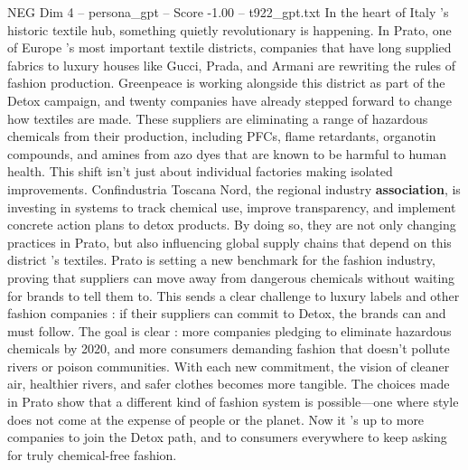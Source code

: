 \begin{textsample}{NEG Dim 4 – persona\_gpt – Score -1.00 – t922\_gpt.txt}  \label{ex:f4_neg_034}
In the heart of Italy ’s historic textile hub, something quietly revolutionary is happening.
In Prato, one of Europe ’s most important textile districts, companies that have long supplied fabrics to luxury houses like Gucci, Prada, and Armani are rewriting the rules of fashion production.
Greenpeace is working alongside this district as part of the Detox campaign, and twenty companies have already stepped forward to change how textiles are made.
These suppliers are eliminating a range of hazardous chemicals from their production, including PFCs, flame retardants, organotin compounds, and amines from azo dyes that are known to be harmful to human health.
This shift isn't just about individual factories making isolated improvements.
Confindustria Toscana Nord, the regional industry \textbf{association}, is investing in systems to track chemical use, improve transparency, and implement concrete action plans to detox products.
By doing so, they are not only changing practices in Prato, but also influencing global supply chains that depend on this district ’s textiles.
Prato is setting a new benchmark for the fashion industry, proving that suppliers can move away from dangerous chemicals without waiting for brands to tell them to.
This sends a clear challenge to luxury labels and other fashion companies : if their suppliers can commit to Detox, the brands can and must follow.
The goal is clear : more companies pledging to eliminate hazardous chemicals by 2020, and more consumers demanding fashion that doesn't pollute rivers or poison communities.
With each new commitment, the vision of cleaner air, healthier rivers, and safer clothes becomes more tangible.
The choices made in Prato show that a different kind of fashion system is possible—one where style does not come at the expense of people or the planet.
Now it ’s up to more companies to join the Detox path, and to consumers everywhere to keep asking for truly chemical-free fashion.

\end{textsample}

